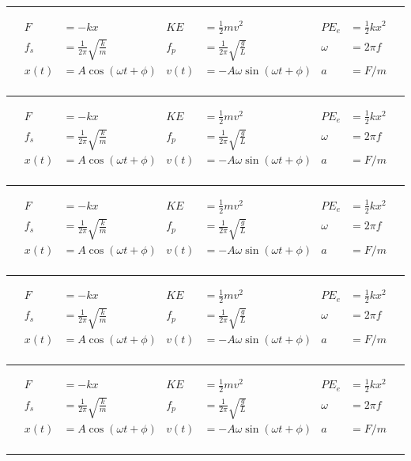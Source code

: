 \documentclass[10pt]{article}
\begin{document}
\pagestyle{empty}


\newcommand{\content}{
  \hrule
  \vspace{\stretch{1}}

  \begin{align*}
    F &= -kx &
    KE &= \frac{1}{2}mv^2 &
    PE_e &= \frac{1}{2}kx^2\\
    f_s &=\frac{1}{2\pi}\sqrt{\frac{k}{m}} &
    f_p &=\frac{1}{2\pi}\sqrt{\frac{g}{L}} &
    \omega &= 2\pi f \\
    x(t) &= A \cos\left(\omega t + \phi\right) &
    v(t) &= - A\omega\sin\left(\omega t + \phi\right) &
    a &= F/m\\
  \end{align*}

}


\content

\content

\content

\content

\content

\hrule
\end{document}
